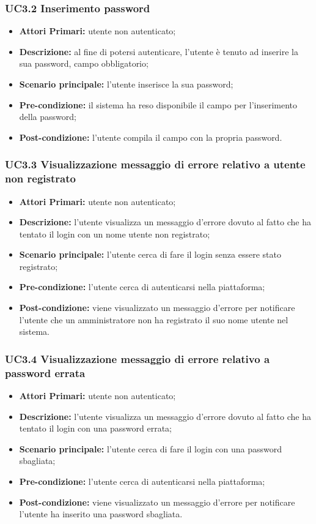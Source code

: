 \subsubsection{UC3.2 Inserimento password}
\begin{itemize}
	\item \textbf{Attori Primari:} utente non autenticato;
	\item \textbf{Descrizione:} al fine di potersi autenticare, l'utente è tenuto ad inserire la sua password, campo obbligatorio;
	\item \textbf{Scenario principale:} l'utente inserisce la sua password;
	\item \textbf{Pre-condizione:} il sistema ha reso disponibile il campo per l'inserimento della password;
	\item \textbf{Post-condizione:} l'utente compila il campo con la propria password.
\end{itemize}	

\subsubsection{UC3.3 Visualizzazione messaggio di errore relativo a utente non registrato}
\begin{itemize}
	\item \textbf{Attori Primari:} utente non autenticato;
	\item \textbf{Descrizione:} l'utente visualizza un messaggio d'errore dovuto al fatto che ha tentato il login con un nome utente non registrato;
	\item \textbf{Scenario principale:} l'utente cerca di fare il login senza essere stato registrato;
	\item \textbf{Pre-condizione:} l'utente cerca di autenticarsi nella piattaforma;
	\item \textbf{Post-condizione:} viene visualizzato un messaggio d'errore per notificare l'utente che un amministratore non ha registrato il suo nome utente nel sistema.
\end{itemize}

\subsubsection{UC3.4 Visualizzazione messaggio di errore relativo a password errata}
\begin{itemize}
	\item \textbf{Attori Primari:} utente non autenticato;
	\item \textbf{Descrizione:} l'utente visualizza un messaggio d'errore dovuto al fatto che ha tentato il login con una password errata;
	\item \textbf{Scenario principale:} l'utente cerca di fare il login con una password sbagliata;
	\item \textbf{Pre-condizione:} l'utente cerca di autenticarsi nella piattaforma;
	\item \textbf{Post-condizione:} viene visualizzato un messaggio d'errore per notificare l'utente ha inserito una password sbagliata.
\end{itemize}

